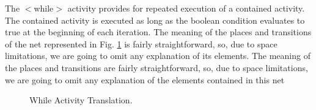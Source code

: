 The $<$while$>$ activity provides for repeated execution of a contained activity. The contained 
activity is executed as long as the boolean condition evaluates to true at the beginning of 
each iteration. The meaning of the places and transitions of the net represented in Fig. \ref{while} is fairly straightforward, so, due to space limitations, we are going to omit any explanation of its elements. 
The meaning of the places and transitions are fairly straightforward, so, due to space limitations, we are going to omit any explanation of the elements contained in this net 

\begin{figure}[!ht]
\begin{center}
\end{center}
\caption{\label{while} While Activity Translation.}
\vspace{-0.7cm}
\end{figure}
\vspace{-0.5cm}
\newpage
